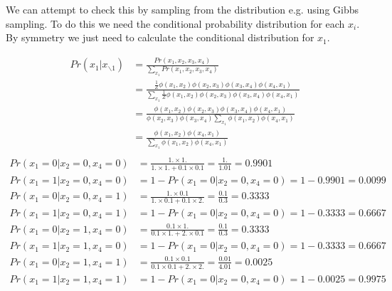 \documentclass[11pt]{report}
\begin{document}
We can attempt to check this by sampling from the distribution e.g. using Gibbs sampling. To do this we need the conditional probability distribution for each $x_i$. By symmetry we just need to calculate the conditional distribution for $x_1$.

\begin{align*}
  Pr(x_1 | x_{\backslash 1}) &= \frac{Pr(x_1, x_2, x_3, x_4)}{\sum_{x_1} Pr(x_1, x_2, x_3, x_4)} \\
     &= \frac{\frac{1}{Z} \phi(x_1, x_2) \phi(x_2, x_3) \phi(x_3, x_4) \phi(x_4, x_1)}
         {\sum_{x_1}  \frac{1}{Z} \phi(x_1, x_2) \phi(x_2, x_3) \phi(x_3, x_4) \phi(x_4, x_1)} \\
     &= \frac{\phi(x_1, x_2) \phi(x_2, x_3) \phi(x_3, x_4) \phi(x_4, x_1)}
     	{\phi(x_2, x_3) \phi(x_3, x_4) \sum_{x_1} \phi(x_1, x_2) \phi(x_4, x_1)} \\
     &= \frac {\phi(x_1, x_2) \phi(x_4, x_1)}{\sum_{x_1} \phi(x_1, x_2) \phi(x_4, x_1)} \\
 \end{align*}
 \begin{align*}
  Pr(x_1 = 0 | x_2 = 0, x_4 = 0) &= \frac{1. \times 1.}{1. \times 1. + 0.1 \times 0.1} = \frac{1.}{1.01} = 0.9901 \\
  Pr(x_1 = 1 | x_2 = 0, x_4 = 0) &= 1 - Pr(x_1 = 0 | x_2 = 0, x_4 = 0) = 1 - 0.9901 = 0.0099 \\
  Pr(x_1 = 0 | x_2 = 0, x_4 = 1) &= \frac{1. \times 0.1}{1. \times 0.1 + 0.1 \times 2.} = \frac{0.1}{0.3} = 0.3333 \\
  Pr(x_1 = 1 | x_2 = 0, x_4 = 1) &= 1 - Pr(x_1 = 0 | x_2 = 0, x_4 = 0) = 1 - 0.3333 = 0.6667 \\
  Pr(x_1 = 0 | x_2 = 1, x_4 = 0) &= \frac{0.1 \times 1.}{0.1 \times 1. + 2. \times 0.1} = \frac{0.1}{0.3} = 0.3333 \\
  Pr(x_1 = 1 | x_2 = 1, x_4 = 0) &= 1 - Pr(x_1 = 0 | x_2 = 0, x_4 = 0) = 1 - 0.3333 = 0.6667 \\
  Pr(x_1 = 0 | x_2 = 1, x_4 = 1) &= \frac{0.1 \times 0.1}{0.1 \times 0.1 + 2. \times 2.} = \frac{0.01}{4.01} = 0.0025 \\
  Pr(x_1 = 1 | x_2 = 1, x_4 = 1) &= 1 - Pr(x_1 = 0 | x_2 = 0, x_4 = 0) = 1 - 0.0025 = 0.9975 \\
\end{align*}
\end{document}
